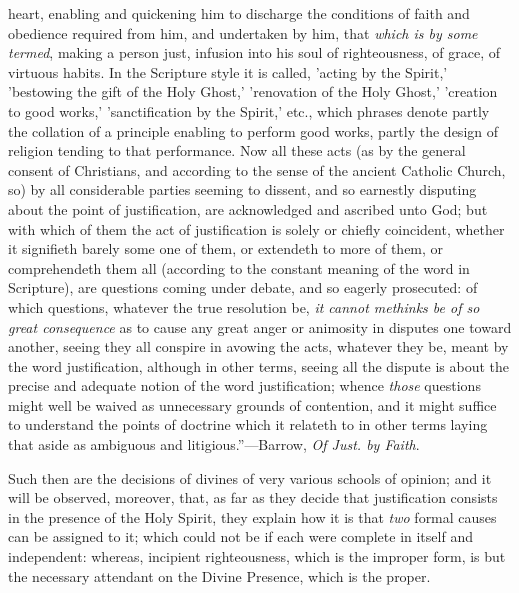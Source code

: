 heart, enabling and quickening him to discharge the conditions of
faith and obedience required from him, and undertaken by him, that \emph{which
is by some} \emph{termed}, making a person just, infusion
into his soul of righteousness, of grace, of virtuous habits. In the
Scripture style it is called, 'acting by the Spirit,' 'bestowing the
gift of the Holy Ghost,' 'renovation of the Holy Ghost,' 'creation to
good works,' 'sanctification by the Spirit,' etc., which phrases
denote partly the collation of a principle enabling to perform good
works, partly the design of religion tending to that performance. Now
all these acts (as by the general consent of Christians, and according
to the sense of the ancient Catholic Church, so) by all considerable
parties seeming to dissent, and so earnestly disputing about the point
of justification, are acknowledged and ascribed unto God; but with
which of them the act of justification is solely or chiefly
coincident, whether it signifieth barely some one of them, or
extendeth to more of them, or comprehendeth them all (according to the
constant meaning of the word in Scripture), are questions coming under
debate, and so eagerly prosecuted: of which questions, whatever the
true resolution be, \emph{it cannot methinks be of so great consequence}
as to cause any great anger or animosity in disputes one toward
another, seeing they all conspire in avowing the acts, whatever they
be, meant by the word justification, although in other terms, seeing
all the dispute is about the precise and adequate notion of the word
justification; whence \emph{those} questions might well be waived as
unnecessary grounds of contention, and it might suffice to understand
the points of doctrine which it relateth to in other terms laying that
aside as ambiguous and litigious.''—Barrow, \emph{Of Just. by Faith}.

Such then are the decisions of divines of very various schools of
opinion; and it will be observed, moreover, that, as far as they
decide that justification consists in the presence of the Holy Spirit,
they explain how it is that \emph{two} formal causes can be assigned to it;
which could not be if each were complete in itself and independent:
whereas, incipient righteousness, which is the improper form, is but
the necessary attendant on the Divine Presence, which is the
proper.

